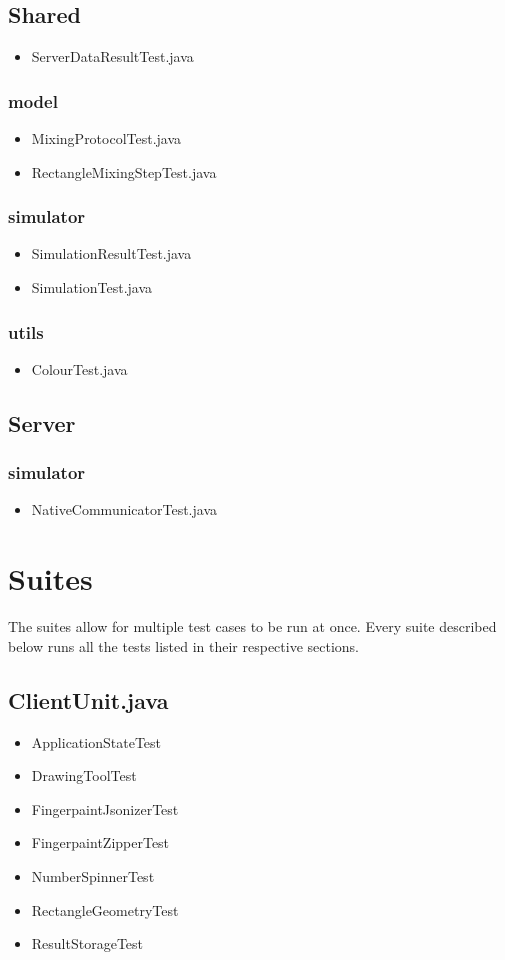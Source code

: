 \subsection{Shared}
\begin{itemize}
\item ServerDataResultTest.java
\end{itemize}
\subsubsection{model}
\begin{itemize}
\item MixingProtocolTest.java
\item RectangleMixingStepTest.java
\end{itemize}
\subsubsection{simulator}
\begin{itemize}
\item SimulationResultTest.java
\item SimulationTest.java
\end{itemize}
\subsubsection{utils}
\begin{itemize}
\item ColourTest.java
\end{itemize}

\subsection{Server}
\subsubsection{simulator}
\begin{itemize}
\item NativeCommunicatorTest.java
\end{itemize}

\section{Suites}
The suites allow for multiple test cases to be run at once. Every suite described below runs all the tests listed in their respective sections.

\subsection{ClientUnit.java}
\begin{itemize}
\item 	ApplicationStateTest
\item 	DrawingToolTest
\item 	FingerpaintJsonizerTest
\item 	FingerpaintZipperTest
\item 	NumberSpinnerTest
\item 	RectangleGeometryTest
\item 	ResultStorageTest
\end{itemize}

